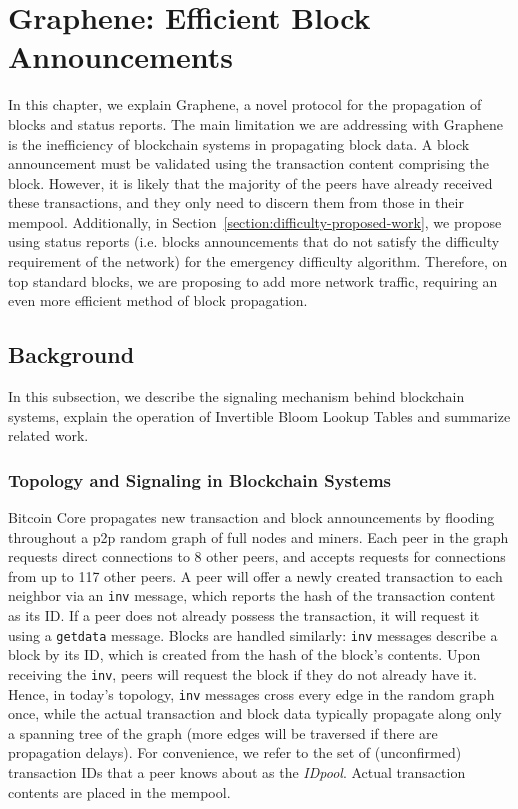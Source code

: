 \chapter{Graphene: Efficient Block Announcements}
\label{graphene}

In this chapter, we explain Graphene, a novel protocol for the propagation of blocks and status reports. The main limitation we are addressing with Graphene is the inefficiency of blockchain systems in propagating block data.  A block announcement must be validated using  the transaction content comprising the block.  However, it is likely that the majority of the peers have already received these transactions, and they only need to discern them from those in their mempool. Additionally, in Section~\ref{section:difficulty-proposed-work}, we propose using status reports (i.e. blocks announcements that do not satisfy the difficulty requirement of the network) for the emergency difficulty algorithm. Therefore, on top standard blocks, we are proposing to add more network traffic, requiring an even more efficient method of block propagation.

\section{Background}
In this subsection, we describe the signaling mechanism behind blockchain systems, explain the operation of Invertible Bloom Lookup Tables and summarize related work.

\subsection{Topology and Signaling in Blockchain Systems} 
Bitcoin Core propagates new transaction and
block announcements by flooding throughout a p2p random graph of full
nodes and miners. Each peer in the graph requests direct connections
to 8 other peers, and accepts requests for connections from up to 117
other peers. A peer will offer a newly created transaction to each
neighbor via an {\tt inv} message, which reports the hash of the
transaction content as its ID. If a peer does not already possess the
transaction, it will request it using a {\tt getdata} message. Blocks
are handled similarly: {\tt inv} messages describe a block by its ID, which
is created from the hash of the block's contents.  Upon receiving the
{\tt inv}, peers will request the block if they do not already have it.
Hence, in today's topology, {\tt inv} messages cross every edge in the
random graph once, while the actual transaction and block data
typically propagate along only a spanning tree of the graph (more
edges will be traversed if there are propagation delays).  For
convenience, we refer to the set of (unconfirmed)
transaction IDs that a peer knows about as the {\em IDpool}. Actual
transaction contents are placed in the mempool.

